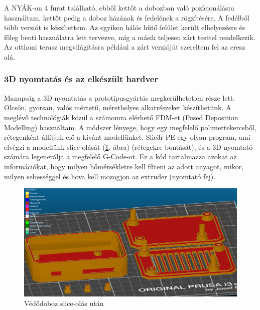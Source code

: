 \documentclass[../main.tex]{subfiles}
\begin{document}
            A NYÁK-on 4 furat található, ebből kettőt a dobozban való pozícionálásra használtam, kettőt pedig a doboz házának és fedelének a rögzítésére. A fedélből több verziót is készítettem. Az egyiken hálós hűtő felület került elhelyezésre és főleg benti használatra lett tervezve, míg a másik teljesen zárt testtel rendelkezik. Az otthoni terasz megvilágításra például a zárt verziójút szereltem fel az eresz alá. 
            
        
        \subsubsection{3D nyomtatás és az elkészült hardver}
            Manapság a 3D nyomtatás a prototípusgyártás megkerülhetetlen része lett. Olcsón, gyorsan, valós mértetű, mérethelyes alkatrészeket készíthetünk. A meglévő technológiák közül a számomra elérhető FDM-et (Fused Deposition Modelling) használtam. A módszer lényege, hogy egy megfelelő polimertekercsből, rétegenként állítjuk elő a kivánt modellünket. Slic3r PE egy olyan program, ami elvégzi a modellünk slice-olását (\ref{fig:ledstrip_case_slice}. ábra) (rétegekre bontását), és a 3D nyomtató számára legenerálja a megfelelő G-Code-ot. Ez a kód tartalmazza azokat az információkat, hogy milyen hőmérsékletre kell fűteni az adott anyagot, mikor, milyen sebességgel és hova kell mozogjon az extruder (nyomtató fej). 
            
            \begin{figure}[h!]
                \centering
                    \includegraphics[width=13.5cm]{resources/pcb_res/slic3r_ledstrip_case.png}
                    \caption{Védődoboz slice-olás után}
                    \label{fig:ledstrip_case_slice}
            \end{figure} 
            
\end{document}
